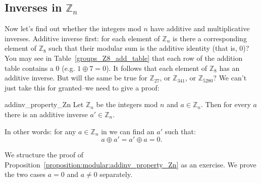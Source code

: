 

\subsection{Inverses in ${\mathbb Z}_n$}

Now let's find out whether the integers mod $n$ have additive and multiplicative inverses. Additive inverse first:  for each element of  ${\mathbb Z}_n$ is there a corresponding element of ${\mathbb Z}_8$ such that their modular sum is the additive identity (that is, 0)?  You may see in Table~\ref{groups_Z8_add_table} that each row of the addition table contains a $0$ (e.g. $1\oplus 7 = 0$).  It follows that each element  of ${\mathbb Z}_8$ has an additive inverse. But will the same be true for ${\mathbb Z}_{27}$, or ${\mathbb Z}_{341}$,  or ${\mathbb Z}_{5280}$? We can't just take this for granted--we need to give a proof:

\begin{prop}{addinv_property_Zn}
Let ${\mathbb Z}_n$ be the  integers mod $n$ and $a \in {\mathbb Z}_n$. Then for every  $a$  there is an additive inverse $a' \in {\mathbb Z}_n$.  

In other words: for any $a \in {\mathbb Z}_n$ in  we can find an $a'$ such that:
\[
a \oplus a' = a' \oplus a  = 0.
\]
\end{prop}

We structure the proof of Proposition~\ref{proposition:modular:addinv_property_Zn} as an exercise. We prove the two cases $a=0$ and $a \neq 0$ separately.

